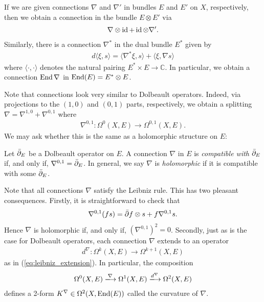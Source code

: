 \documentclass[12pt]{ociamthesis}  %
\begin{document}
\begin{example}\label{ex:connection_on_end}
  If we are given connections $\nabla$ and $\nabla'$ in bundles $E$ and $E'$ on $X$,
  respectively, then we obtain a connection in the bundle $E\otimes E'$ via
  \begin{align*}
    \nabla \otimes \operatorname{id} + \operatorname{id} \otimes \nabla'.
  \end{align*}
  Similarly, there is a connection $\nabla^*$ in the dual bundle $E^*$ given by
  \begin{align*}
    d\langle \xi,s\rangle
    = \langle \nabla^*\xi, s \rangle + \langle \xi,\nabla s\rangle
  \end{align*}
  where $\langle\cdot,\cdot\rangle$ denotes the natural pairing $E^*\times E\to\mathbb{C}$.
  In particular, we obtain a connection $\operatorname{End}\nabla$ in $\operatorname{End}(E) = E^* \otimes E$.
\end{example}

Note that connections look very similar to Dolbeault operators.
Indeed, via projections to the $(1,0)$ and $(0,1)$ parts, respectively,
we obtain a splitting $\nabla = \nabla^{1,0} + \nabla^{0,1}$
where
\begin{align*}
  \nabla^{0,1} : \Omega^0(X,E) \to \Omega^{0,1}(X,E).
\end{align*}
We may ask whether this is the same as a holomorphic structure on $E$:

\begin{definition}
  Let ${\bar{\partial}}_E$ be a Dolbeault operator on $E$.
  A connection $\nabla$ in $E$ is \emph{compatible with ${\bar{\partial}}_E$}
  if, and only if, $\nabla^{0,1} = {\bar{\partial}}_E$. In general, we say
  $\nabla$ is \emph{holomorphic} if it is compatible with some
  ${\bar{\partial}}_E$.
\end{definition}

Note that all connections $\nabla$ satisfy the Leibniz rule. This has
two pleasant consequences. Firstly, it is straightforward to check that
\begin{align*}
  \nabla^{0,1} (fs) = {\bar{\partial}} f\otimes s + f \nabla^{0,1} s.
\end{align*}
Hence $\nabla$ is holomorphic if, and only if, $(\nabla^{0,1})^2 = 0$.
Secondly, just as is the case for Dolbeault operators, each connection
$\nabla$ extends to an operator
\begin{align*}
  d^\nabla : \Omega^k(X,E) \longrightarrow \Omega^{k+1}(X,E)
\end{align*}
as in (\ref{eq:leibniz_extension}). In particular, the
composition
\begin{align*}
  \Omega^0(X,E) \xlongrightarrow{\nabla}
  \Omega^1(X,E) \xlongrightarrow{d^\nabla}
  \Omega^{2}(X,E)
\end{align*}
defines a 2-form $K^\nabla\in\Omega^2(X,\operatorname{End}(E))$ called
the curvature of $\nabla$.
\end{document}
